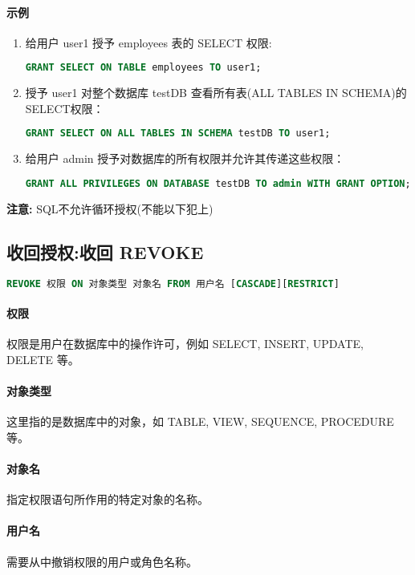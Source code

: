 \paragraph*{示例}
\begin{enumerate}
    \item 给用户 user1 授予 employees 表的 SELECT 权限:
    \begin{lstlisting}[language=SQL]
        GRANT SELECT ON TABLE employees TO user1;
    \end{lstlisting}
    \item 授予 user1 对整个数据库 testDB 查看所有表(ALL TABLES IN SCHEMA)的SELECT权限：
    \begin{lstlisting}[language=SQL]
        GRANT SELECT ON ALL TABLES IN SCHEMA testDB TO user1;
    \end{lstlisting}
    \item 给用户 admin 授予对数据库的所有权限并允许其传递这些权限：
    \begin{lstlisting}[language=SQL]
        GRANT ALL PRIVILEGES ON DATABASE testDB TO admin WITH GRANT OPTION;
    \end{lstlisting}
\end{enumerate}
\textbf{注意:} SQL不允许循环授权(不能以下犯上)
\subsection{收回授权:收回 REVOKE}
\begin{lstlisting}[language=SQL]
    REVOKE 权限 ON 对象类型 对象名 FROM 用户名 [CASCADE][RESTRICT]
\end{lstlisting}
\paragraph*{权限} 
权限是用户在数据库中的操作许可，例如 SELECT, INSERT, UPDATE, DELETE 等。

\paragraph*{对象类型} 
这里指的是数据库中的对象，如 TABLE, VIEW, SEQUENCE, PROCEDURE 等。

\paragraph*{对象名} 
指定权限语句所作用的特定对象的名称。

\paragraph*{用户名} 
需要从中撤销权限的用户或角色名称。

